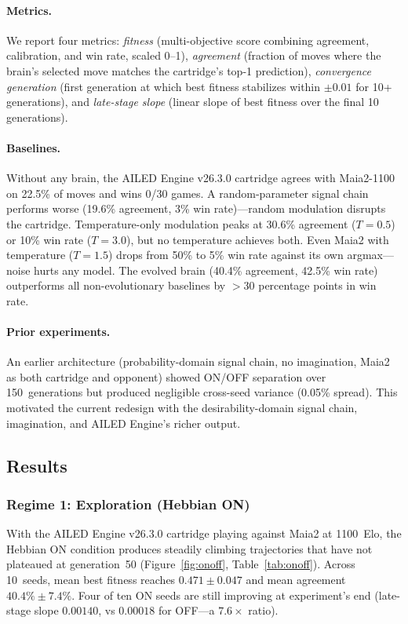 \documentclass[11pt,a4paper]{article}
\begin{document}
\paragraph{Metrics.}
We report four metrics: \emph{fitness} (multi-objective score combining agreement, calibration, and win rate, scaled 0--1), \emph{agreement} (fraction of moves where the brain's selected move matches the cartridge's top-1 prediction), \emph{convergence generation} (first generation at which best fitness stabilizes within $\pm 0.01$ for 10+ generations), and \emph{late-stage slope} (linear slope of best fitness over the final 10 generations).

\paragraph{Baselines.}
Without any brain, the AILED Engine v26.3.0 cartridge agrees with Maia2-1100 on 22.5\% of moves and wins 0/30 games.
A random-parameter signal chain performs worse (19.6\% agreement, 3\% win rate)---random modulation disrupts the cartridge.
Temperature-only modulation peaks at 30.6\% agreement ($T{=}0.5$) or 10\% win rate ($T{=}3.0$), but no temperature achieves both.
Even Maia2 with temperature ($T{=}1.5$) drops from 50\% to 5\% win rate against its own argmax---noise hurts any model.
The evolved brain (40.4\% agreement, 42.5\% win rate) outperforms all non-evolutionary baselines by $>$30 percentage points in win rate.

\paragraph{Prior experiments.}
An earlier architecture (probability-domain signal chain, no imagination, Maia2 as both cartridge and opponent) showed ON/OFF separation over 150~generations but produced negligible cross-seed variance (0.05\% spread).
This motivated the current redesign with the desirability-domain signal chain, imagination, and AILED Engine's richer output.

\subsection{Results}

\subsubsection{Regime 1: Exploration (Hebbian ON)}

With the AILED Engine v26.3.0 cartridge playing against Maia2 at 1100~Elo, the Hebbian ON condition produces steadily climbing trajectories that have not plateaued at generation~50 (Figure~\ref{fig:onoff}, Table~\ref{tab:onoff}).
Across 10~seeds, mean best fitness reaches $0.471 \pm 0.047$ and mean agreement $40.4\% \pm 7.4\%$.
Four of ten ON seeds are still improving at experiment's end (late-stage slope $0.00140$, vs $0.00018$ for OFF---a $7.6\times$ ratio).
\end{document}
